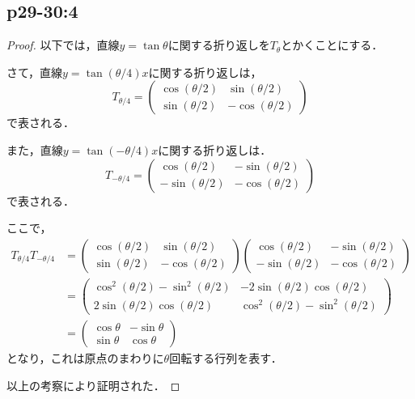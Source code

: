 \documentclass[uplatex,dvipdfmx,a4paper,11pt,fleqn]{jsarticle}
\begin{document}
\subsection*{p29-30:4}

\begin{tleftbar}
    \begin{proof}
        以下では，直線$y= \tan \theta$に関する折り返しを$T_{\theta}$とかくことにする．

        さて，直線$ y = \tan (\theta /4) x$に関する折り返しは，
        \[
            T_{\theta/4} = \begin{pmatrix} \cos (\theta /2) & \sin (\theta /2) \\  \sin (\theta /2) & -\cos (\theta /2) \end{pmatrix}
        \]
        で表される．

        また，直線$y = \tan (-\theta /4)x$に関する折り返しは．
        \[
            T_{-\theta/4} = \begin{pmatrix} \cos (\theta /2) & -\sin (\theta/2) \\ -\sin (\theta/2) & -\cos (\theta /2) \end{pmatrix}
        \]
        で表される．

        ここで，
        \begin{align*} 
            T_{\theta/4} T_{-\theta/4} & = \begin{pmatrix} \cos (\theta /2) & \sin (\theta /2) \\  \sin (\theta /2) & -\cos (\theta /2) \end{pmatrix} \begin{pmatrix} \cos (\theta /2) & -\sin (\theta/2) \\ -\sin (\theta/2) & -\cos (\theta /2) \end{pmatrix} \\
            & =\begin{pmatrix} \cos ^2 (\theta /2)-\sin ^2 (\theta/2) & -2\sin (\theta/2) \cos (\theta/2) \\ 2\sin (\theta/2) \cos (\theta/2) & \cos ^2 (\theta/2)-\sin ^2 (\theta/2) \end{pmatrix} \\
            & = \begin{pmatrix} \cos \theta & -\sin \theta \\ \sin \theta & \cos \theta \end{pmatrix}
        \end{align*} 
        となり，これは原点のまわりに$\theta$回転する行列を表す．

        以上の考察により証明された．
    \end{proof}
\end{tleftbar}
\end{document}
